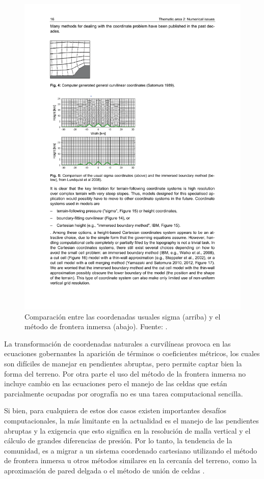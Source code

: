 \begin{figure}[h!]
	\centering
	\includegraphics[width=0.8\linewidth,trim={2.6cm 13.5cm 9.2cm 9cm},clip]{Imagenes/02/coordinates}
	\caption{Comparación entre las coordenadas usuales sigma (arriba) y el método de frontera inmersa (abajo). Fuente: \cite{arnold2012high}.}
	\label{fig:02_coordinates}
\end{figure}
La transformación de coordenadas naturales a curvilíneas provoca en las ecuaciones gobernantes la aparición de términos o coeficientes métricos, los cuales son difíciles de manejar en pendientes abruptas, pero permite captar bien la forma del terreno. Por otra parte el uso del método de la frontera inmersa no incluye cambio en las ecuaciones pero el manejo de las celdas que están parcialmente ocupadas por orografía no es una tarea computacional sencilla.

Si bien, para cualquiera de estos dos casos existen importantes desafíos computacionales, la más limitante en la actualidad es el manejo de las pendientes abruptas y la exigencia que esto significa en la resolución de malla vertical y el cálculo de grandes diferencias de presión. Por lo tanto, la tendencia de la comunidad, es a migrar a un sistema coordenado cartesiano utilizando el método de frontera inmersa u otros métodos similares en la cercanía del terreno, como la aproximación de pared delgada \citep{steppeler2002nonhydrostatic} o el método de unión de celdas \citep{yamazaki2010nonhydrostatic,yamazaki2012non}.

